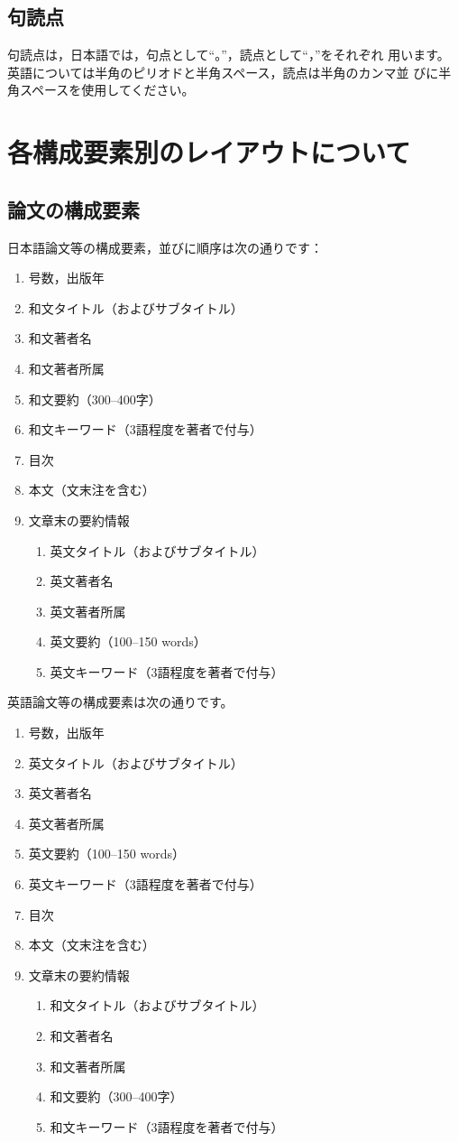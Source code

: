 \documentclass[b5paper,10pt,twocolumn,tombow]{jarticle}
\begin{document}
\subsection{句読点}
句読点は，日本語では，句点として``。''，読点として``，''をそれぞれ
用います。英語については半角のピリオドと半角スペース，読点は半角のカンマ並
びに半角スペースを使用してください。

\section{各構成要素別のレイアウトについて}
\subsection{論文の構成要素}
日本語論文等の構成要素，並びに順序は次の通りです：
\begin{enumerate}
  \item 号数，出版年
  \item 和文タイトル（およびサブタイトル）
  \item 和文著者名
  \item 和文著者所属
  \item 和文要約（300--400字）
  \item 和文キーワード（3語程度を著者で付与）
  \item 目次
  \item 本文（文末注を含む）
  \item 文章末の要約情報
  \begin{enumerate}
    \item 英文タイトル（およびサブタイトル）
    \item 英文著者名
    \item 英文著者所属
    \item 英文要約（100--150 words）
    \item 英文キーワード（3語程度を著者で付与）
  \end{enumerate}
\end{enumerate}
英語論文等の構成要素は次の通りです。
\begin{enumerate}
  \item 号数，出版年
  \item 英文タイトル（およびサブタイトル）
  \item 英文著者名
  \item 英文著者所属
  \item 英文要約（100--150 words）
  \item 英文キーワード（3語程度を著者で付与）
  \item 目次
  \item 本文（文末注を含む）
  \item 文章末の要約情報
  \begin{enumerate}
    \item 和文タイトル（およびサブタイトル）
    \item 和文著者名
    \item 和文著者所属
    \item 和文要約（300--400字）
    \item 和文キーワード（3語程度を著者で付与）
  \end{enumerate}
\end{enumerate}
\end{document}
